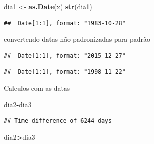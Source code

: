 \documentclass[
]{book}
\newenvironment{Shaded}{\begin{snugshade}}{\end{snugshade}}
\newcommand{\DataTypeTok}[1]{\textcolor[rgb]{0.13,0.29,0.53}{#1}}
\newcommand{\KeywordTok}[1]{\textcolor[rgb]{0.13,0.29,0.53}{\textbf{#1}}}
\newcommand{\NormalTok}[1]{#1}
\newcommand{\OperatorTok}[1]{\textcolor[rgb]{0.81,0.36,0.00}{\textbf{#1}}}
\newcommand{\StringTok}[1]{\textcolor[rgb]{0.31,0.60,0.02}{#1}}
\begin{document}
\begin{Shaded}
\begin{Highlighting}[]
\NormalTok{dia1 <-}\StringTok{ }\KeywordTok{as.Date}\NormalTok{(x)}
\KeywordTok{str}\NormalTok{(dia1)}
\end{Highlighting}
\end{Shaded}

\begin{verbatim}
##  Date[1:1], format: "1983-10-28"
\end{verbatim}

convertendo datas não padronizadas para padrão

\begin{Shaded}
\end{Shaded}

\begin{verbatim}
##  Date[1:1], format: "2015-12-27"
\end{verbatim}

\begin{Shaded}
\end{Shaded}

\begin{verbatim}
##  Date[1:1], format: "1998-11-22"
\end{verbatim}

Calculos com as datas

\begin{Shaded}
\begin{Highlighting}[]
\NormalTok{dia2}\OperatorTok{-}\NormalTok{dia3}
\end{Highlighting}
\end{Shaded}

\begin{verbatim}
## Time difference of 6244 days
\end{verbatim}

\begin{Shaded}
\begin{Highlighting}[]
\NormalTok{dia2}\OperatorTok{>}\NormalTok{dia3}
\end{Highlighting}
\end{Shaded}
\end{document}
